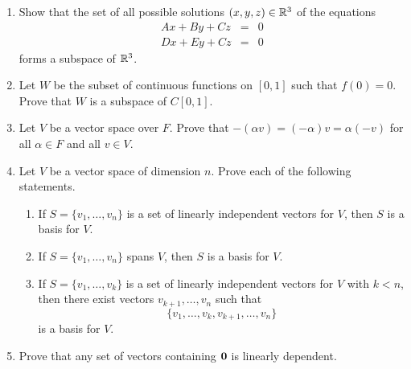 {\begin{enumerate}
\begin{enumerate}
  \bf\item\rm
$\{ (x_1, x_2, x_3) : 3 x_1 + 4 x_3 = 0, 2 x_1 - x_2 + x_3 = 0 \}$

  \bf\item\rm
$\{ (x_1, x_2, x_3) : x_1 - 2 x_2 + 2 x_3 = 2 \}$

  \bf\item\rm
$\{ (x_1, x_2, x_3) : 3 x_1 - 2 x_2^2 = 0 \}$

\end{enumerate}


\bf\item\rm
Show that the set of all possible solutions $(x, y, z) \in {\Bbb R}^3$
of the equations
\begin{eqnarray*}
Ax + B y + C z & = & 0 \\
D x + E y + C z & = & 0
\end{eqnarray*}
forms a subspace of ${\Bbb R}^3$.


\bf\item\rm
Let $W$ be the subset of continuous functions on $[0, 1]$ such that
$f(0) = 0$.  Prove that $W$ is a subspace of $C[0, 1]$.




\bf\item\rm
Let $V$ be a vector space over $F$. Prove that $-(\alpha v) =
(-\alpha)v = \alpha(-v)$ for all $\alpha \in F$ and all $v \in V$. 


\bf\item\rm
Let $V$ be a vector space of dimension $n$. Prove each of the
following statements. 
\begin{enumerate}

 \bf\item\rm
If $S = \{v_1, \ldots, v_n \}$ is a set of linearly independent
vectors for $V$, then $S$ is a basis for $V$. 

 \bf\item\rm
If $S = \{v_1, \ldots, v_n \}$ spans $V$, then $S$ is a basis for $V$.

 \bf\item\rm 
If $S = \{v_1, \ldots, v_k \}$ is a set of linearly independent
vectors for $V$ with $k < n$, then there exist vectors $v_{k+1},
\ldots, v_n$ such that 
\[
\{v_1, \ldots, v_k, v_{k+1}, \ldots, v_n \}
\] 
is a basis for $V$. 

\end{enumerate}


\bf\item\rm
Prove that any set of vectors containing ${\bold 0}$ is linearly
dependent. 



\end{enumerate}}

